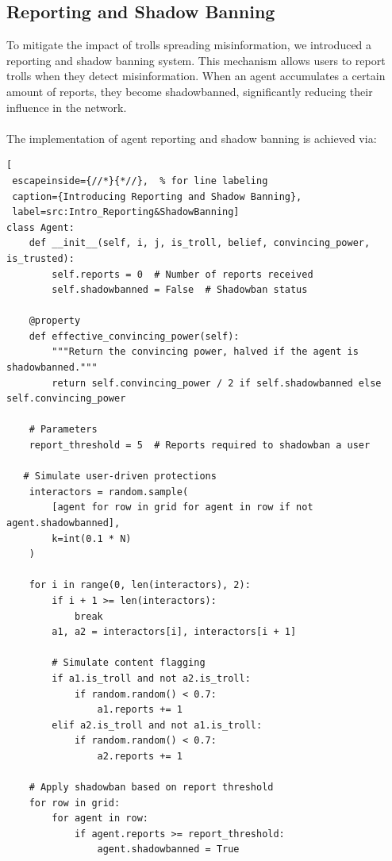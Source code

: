\documentclass[a4paper,11pt]{scrartcl}
\begin{document}
\subsection{Reporting and Shadow Banning}
To mitigate the impact of trolls spreading misinformation, we introduced a reporting and shadow banning system. This mechanism allows users to report trolls when they detect misinformation. When an agent accumulates a certain amount of reports, they become shadowbanned, significantly reducing their influence in the network.
\paragraph{}The implementation of agent reporting and shadow banning is achieved via:
\begin{lstlisting}[
 escapeinside={//*}{*//},  % for line labeling
 caption={Introducing Reporting and Shadow Banning},
 label=src:Intro_Reporting&ShadowBanning]
class Agent:
    def __init__(self, i, j, is_troll, belief, convincing_power, is_trusted):
        self.reports = 0  # Number of reports received
        self.shadowbanned = False  # Shadowban status

    @property
    def effective_convincing_power(self):
        """Return the convincing power, halved if the agent is shadowbanned."""
        return self.convincing_power / 2 if self.shadowbanned else self.convincing_power

    # Parameters
    report_threshold = 5  # Reports required to shadowban a user

   # Simulate user-driven protections
    interactors = random.sample(
        [agent for row in grid for agent in row if not agent.shadowbanned],
        k=int(0.1 * N)
    )

    for i in range(0, len(interactors), 2):
        if i + 1 >= len(interactors):
            break
        a1, a2 = interactors[i], interactors[i + 1]

        # Simulate content flagging
        if a1.is_troll and not a2.is_troll:
            if random.random() < 0.7:
                a1.reports += 1
        elif a2.is_troll and not a1.is_troll:
            if random.random() < 0.7:
                a2.reports += 1

    # Apply shadowban based on report threshold
    for row in grid:
        for agent in row:
            if agent.reports >= report_threshold:
                agent.shadowbanned = True
\end{lstlisting}   
\end{document}
